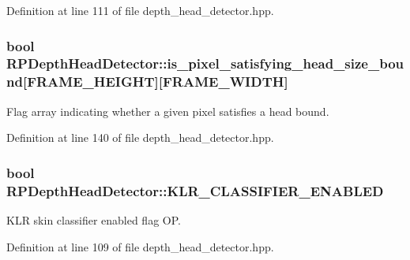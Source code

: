 \-Definition at line 111 of file depth\-\_\-head\-\_\-detector.\-hpp.

\hypertarget{class_r_p_depth_head_detector_a784cfd1c3b1593ba40005c1e9b084481}{
\subsubsection[{is\-\_\-pixel\-\_\-satisfying\-\_\-head\-\_\-size\-\_\-bound}]{\setlength{\rightskip}{0pt plus 5cm}bool {\bf \-R\-P\-Depth\-Head\-Detector\-::is\-\_\-pixel\-\_\-satisfying\-\_\-head\-\_\-size\-\_\-bound}\mbox{[}\-F\-R\-A\-M\-E\-\_\-\-H\-E\-I\-G\-H\-T\mbox{]}\mbox{[}\-F\-R\-A\-M\-E\-\_\-\-W\-I\-D\-T\-H\mbox{]}}}\label{class_r_p_depth_head_detector_a784cfd1c3b1593ba40005c1e9b084481}
\-Flag array indicating whether a given pixel satisfies a head bound. 

\-Definition at line 140 of file depth\-\_\-head\-\_\-detector.\-hpp.

\hypertarget{class_r_p_depth_head_detector_ad8cdcef7633eef892c4524afd6019f93}{
\subsubsection[{\-K\-L\-R\-\_\-\-C\-L\-A\-S\-S\-I\-F\-I\-E\-R\-\_\-\-E\-N\-A\-B\-L\-E\-D}]{\setlength{\rightskip}{0pt plus 5cm}bool {\bf \-R\-P\-Depth\-Head\-Detector\-::\-K\-L\-R\-\_\-\-C\-L\-A\-S\-S\-I\-F\-I\-E\-R\-\_\-\-E\-N\-A\-B\-L\-E\-D}}}\label{class_r_p_depth_head_detector_ad8cdcef7633eef892c4524afd6019f93}
\-K\-L\-R skin classifier enabled flag \-O\-P. 

\-Definition at line 109 of file depth\-\_\-head\-\_\-detector.\-hpp.

